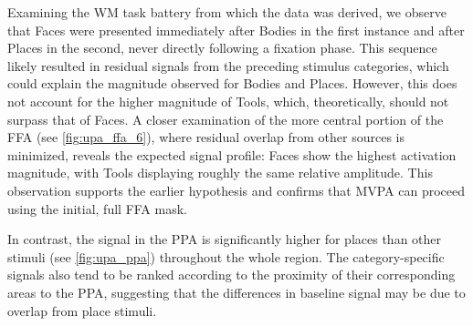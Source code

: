 Examining the \gls{WM} task battery from which the data was derived, we observe that Faces were presented immediately after Bodies in the first instance and after Places in the second, never directly following a fixation phase. This sequence likely resulted in residual signals from the preceding stimulus categories, which could explain the magnitude observed for Bodies and Places. However, this does not account for the higher magnitude of Tools, which, theoretically, should not surpass that of Faces. A closer examination of the more central portion of the \gls{FFA} (see \autoref{fig:upa_ffa_6}), where residual overlap from other sources is minimized, reveals the expected signal profile: Faces show the highest activation magnitude, with Tools displaying roughly the same relative amplitude. This observation supports the earlier hypothesis and confirms that \gls{MVPA} can proceed using the initial, full \gls{FFA} mask.

In contrast, the signal in the \gls{PPA} is significantly higher for places than other stimuli (see \autoref{fig:upa_ppa}) throughout the whole region. The category-specific signals also tend to be ranked according to the proximity of their corresponding areas to the \gls{PPA}, suggesting that the differences in baseline signal may be due to overlap from place stimuli.


